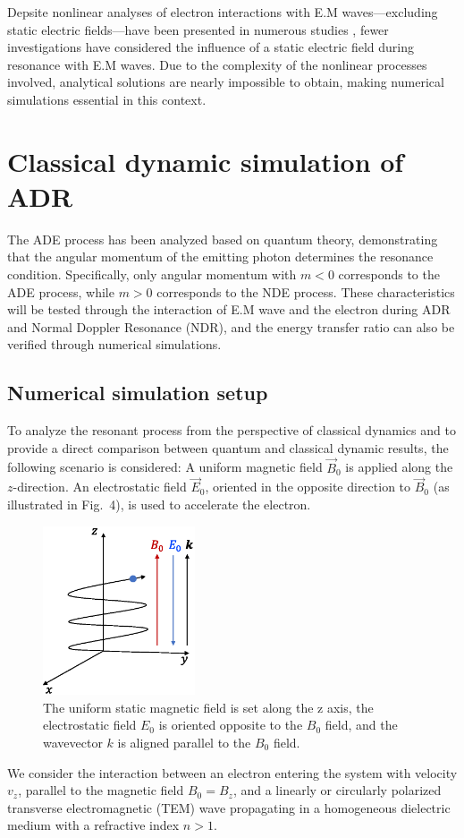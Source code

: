 \documentclass{cpbtex}
\begin{document}
\begin{CJK*}{GBK}{song}
Depsite nonlinear analyses of electron interactions with E.M waves—excluding static electric fields—have been presented in numerous studies \cite{liu2004particle,qian1999exact,weyssow1990motion,gogoberidze2005origin,roberts1964motion,bourdier2000dynamics,nusinovich1999theory,nusinovich1995theory,qian2000relativistic}, fewer investigations have considered the influence of a static electric field during resonance with E.M waves. Due to the complexity of the nonlinear processes involved, analytical solutions are nearly impossible to obtain, making numerical simulations essential in this context.

\section{Classical dynamic simulation of ADR}\label{sec:level2}
The ADE process has been analyzed based on quantum theory, demonstrating that the angular momentum of the emitting photon determines the resonance condition. Specifically, only angular momentum with  $m < 0 $ corresponds to the ADE process, while $m >0 $ corresponds to the NDE process. These characteristics will be tested through the interaction of E.M wave and the electron during ADR and Normal Doppler Resonance (NDR), and the energy transfer ratio can also be verified through numerical simulations.
\subsection{Numerical simulation setup}
To analyze the resonant process from the perspective of classical dynamics and to provide a direct comparison between quantum and classical dynamic results, the following scenario is considered: A uniform magnetic field \( \vec{B}_0 \) is applied along the \( z \)-direction. An electrostatic field \( \vec{E}_0 \), oriented in the opposite direction to \( \vec{B}_0 \) (as illustrated in Fig.~4), is used to accelerate the electron. 
\begin{figure}
\centering
\includegraphics[width=0.4\textwidth]{Figure4.eps}%
\caption{\label{fig:Setup}The uniform static magnetic field is set along the z axis, the electrostatic field $E_0$ is oriented opposite to the $B_0$ field, and the wavevector $k$ is aligned parallel to the $B_0$ field.}
\end{figure}
We consider the interaction between an electron entering the system with velocity \( v_z \), parallel to the magnetic field \( B_0 = B_z \), and a linearly or circularly polarized transverse electromagnetic (TEM) wave propagating in a homogeneous dielectric medium with a refractive index \( n > 1 \).


\end{CJK*}
\end{document}
